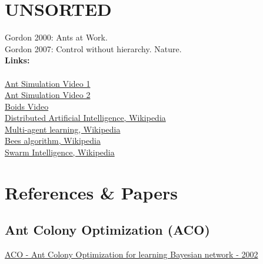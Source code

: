 \section{UNSORTED}
Gordon 2000: Ants at Work.
\\
Gordon 2007: Control without hierarchy. Nature.
\\\textbf{Links:}\\
\\
\href{https://www.youtube.com/watch?v=X-iSQQgOd1A}{Ant Simulation Video 1}
\\
\href{https://www.youtube.com/watch?v=81GQNPJip2Y}{Ant Simulation Video 2}
\\
\href{https://www.youtube.com/watch?v=bqtqltqcQhw}{Boids Video}
\\
\href{https://en.wikipedia.org/wiki/Distributed_artificial_intelligence}{Distributed Artificial Intelligence, Wikipedia}
\\
\href{https://en.wikipedia.org/wiki/Multi-agent_learning}{Multi-agent learning, Wikipedia}
\\
\href{https://en.wikipedia.org/wiki/Bees_algorithm}{Bees algorithm, Wikipedia}
\\
\href{https://en.wikipedia.org/wiki/Swarm_intelligence}{Swarm Intelligence, Wikipedia}

\section{References \& Papers}
\subsection{Ant Colony Optimization (ACO)}
\href{https://www.sciencedirect.com/science/article/pii/S0888613X02000919}{ACO - Ant Colony Optimization for learning Bayesian network - 2002}

